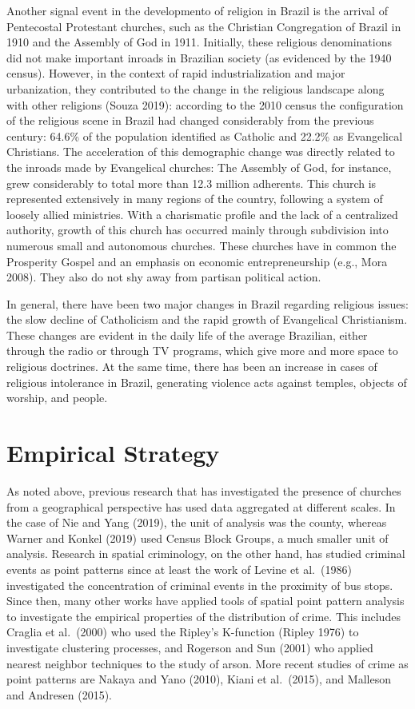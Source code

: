 \documentclass[smallextended]{svjour3}       %
\begin{document}
Another signal event in the developmento of religion in Brazil is the
arrival of Pentecostal Protestant churches, such as the Christian
Congregation of Brazil in 1910 and the Assembly of God in 1911.
Initially, these religious denominations did not make important inroads
in Brazilian society (as evidenced by the 1940 census). However, in the
context of rapid industrialization and major urbanization, they
contributed to the change in the religious landscape along with other
religions (Souza 2019): according to the 2010 census the configuration
of the religious scene in Brazil had changed considerably from the
previous century: 64.6\% of the population identified as Catholic and
22.2\% as Evangelical Christians. The acceleration of this demographic
change was directly related to the inroads made by Evangelical churches:
The Assembly of God, for instance, grew considerably to total more than
12.3 million adherents. This church is represented extensively in many
regions of the country, following a system of loosely allied ministries.
With a charismatic profile and the lack of a centralized authority,
growth of this church has occurred mainly through subdivision into
numerous small and autonomous churches. These churches have in common
the Prosperity Gospel and an emphasis on economic entrepreneurship
(e.g., Mora 2008). They also do not shy away from partisan political
action.

In general, there have been two major changes in Brazil regarding
religious issues: the slow decline of Catholicism and the rapid growth
of Evangelical Christianism. These changes are evident in the daily life
of the average Brazilian, either through the radio or through TV
programs, which give more and more space to religious doctrines. At the
same time, there has been an increase in cases of religious intolerance
in Brazil, generating violence acts against temples, objects of worship,
and people.

\hypertarget{methods}{%
\section{Empirical Strategy}\label{methods}}

As noted above, previous research that has investigated the presence of
churches from a geographical perspective has used data aggregated at
different scales. In the case of Nie and Yang (2019), the unit of
analysis was the county, whereas Warner and Konkel (2019) used Census
Block Groups, a much smaller unit of analysis. Research in spatial
criminology, on the other hand, has studied criminal events as point
patterns since at least the work of Levine et al.~(1986) investigated
the concentration of criminal events in the proximity of bus stops.
Since then, many other works have applied tools of spatial point pattern
analysis to investigate the empirical properties of the distribution of
crime. This includes Craglia et al.~(2000) who used the Ripley's
K-function (Ripley 1976) to investigate clustering processes, and
Rogerson and Sun (2001) who applied nearest neighbor techniques to the
study of arson. More recent studies of crime as point patterns are
Nakaya and Yano (2010), Kiani et al.~(2015), and Malleson and Andresen
(2015).
\end{document}
